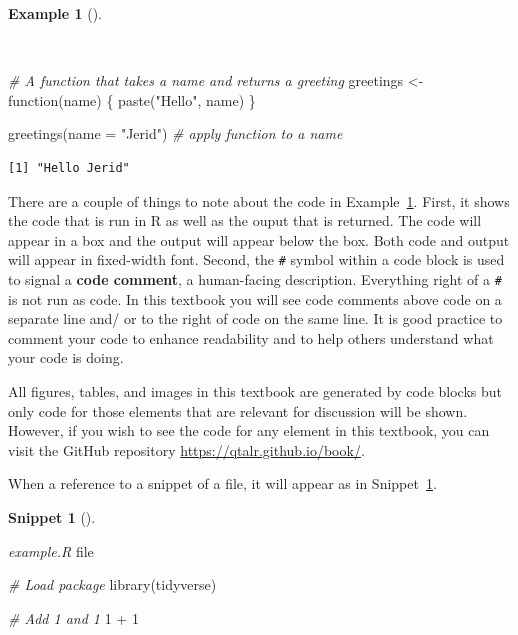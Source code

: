 \documentclass[
  letterpaper,
  krantz1]{latex/krantz-mod}
\newenvironment{Shaded}{\begin{snugshade}}{\end{snugshade}}
\newcommand{\AttributeTok}[1]{\textcolor[rgb]{0.00,0.00,0.00}{#1}}
\newcommand{\CommentTok}[1]{\textcolor[rgb]{0.00,0.00,0.00}{\textit{#1}}}
\newcommand{\ControlFlowTok}[1]{\textcolor[rgb]{0.00,0.00,0.00}{#1}}
\newcommand{\DecValTok}[1]{\textcolor[rgb]{0.00,0.00,0.00}{#1}}
\newcommand{\FunctionTok}[1]{\textcolor[rgb]{0.00,0.00,0.00}{#1}}
\newcommand{\NormalTok}[1]{\textcolor[rgb]{0.00,0.00,0.00}{#1}}
\newcommand{\OtherTok}[1]{\textcolor[rgb]{0.00,0.00,0.00}{#1}}
\newcommand{\SpecialCharTok}[1]{\textcolor[rgb]{0.00,0.00,0.00}{#1}}
\newcommand{\StringTok}[1]{\textcolor[rgb]{0.00,0.00,0.00}{#1}}
\theoremstyle{definition}
\newtheorem{example}{Example}[chapter]
\theoremstyle{definition}
\newtheorem{definition}{Snippet}[chapter]
\theoremstyle{remark}
\begin{document}
\begin{example}[]\protect\hypertarget{exm-code-block}{}\label{exm-code-block}

~

\begin{Shaded}
\begin{Highlighting}[numbers=left,,]
\CommentTok{\# A function that takes a name and returns a greeting}
\NormalTok{greetings }\OtherTok{\textless{}{-}} \ControlFlowTok{function}\NormalTok{(name) \{}
  \FunctionTok{paste}\NormalTok{(}\StringTok{"Hello"}\NormalTok{, name)}
\NormalTok{\}}

\FunctionTok{greetings}\NormalTok{(}\AttributeTok{name =} \StringTok{"Jerid"}\NormalTok{) }\CommentTok{\# apply function to a name}
\end{Highlighting}
\end{Shaded}

\begin{verbatim}
[1] "Hello Jerid"
\end{verbatim}

\end{example}

There are a couple of things to note about the code in
Example~\ref{exm-code-block}. First, it shows the code that is run in R
as well as the ouput that is returned. The code will appear in a box and
the output will appear below the box. Both code and output will appear
in fixed-width font. Second, the \texttt{\#} symbol within a code block
is used to signal a \textbf{code comment}, a human-facing description.
Everything right of a \texttt{\#} is not run as code. In this textbook
you will see code comments above code on a separate line and/ or to the
right of code on the same line. It is good practice to comment your code
to enhance readability and to help others understand what your code is
doing.

All figures, tables, and images in this textbook are generated by code
blocks but only code for those elements that are relevant for discussion
will be shown. However, if you wish to see the code for any element in
this textbook, you can visit the GitHub repository
\url{https://qtalr.github.io/book/}.

When a reference to a snippet of a file, it will appear as in
Snippet~\ref{def-r-code}.

\begin{definition}[]\protect\hypertarget{def-r-code}{}\label{def-r-code}

\emph{example.R} file

\begin{Shaded}
\begin{Highlighting}[numbers=left,,]
\CommentTok{\# Load package}
\FunctionTok{library}\NormalTok{(tidyverse)}

\CommentTok{\# Add 1 and 1}
\DecValTok{1} \SpecialCharTok{+} \DecValTok{1}
\end{Highlighting}
\end{Shaded}

\end{definition}
\end{document}
